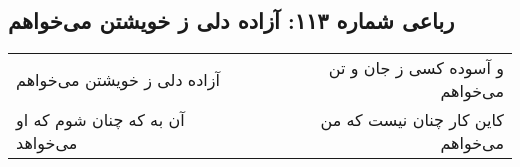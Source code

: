 \begin{center}
\section*{رباعی شماره ۱۱۳: آزاده دلی ز خویشتن می‌خواهم}
\label{sec:113}
\begin{longtable}{l p{0.5cm} r}
آزاده دلی ز خویشتن می‌خواهم
&&
و آسوده کسی ز جان و تن می‌خواهم
\\
آن به که چنان شوم که او می‌خواهد
&&
کاین کار چنان نیست که من می‌خواهم
\\
\end{longtable}
\end{center}
